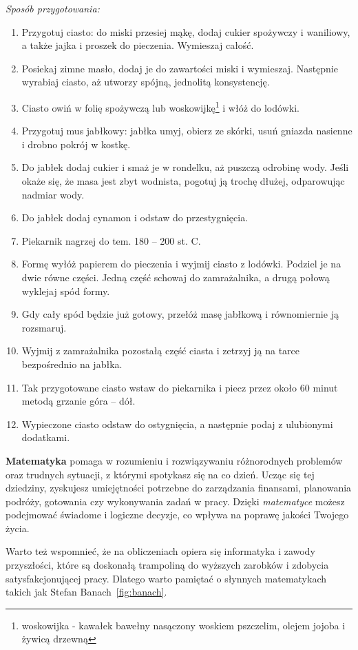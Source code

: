 \emph{Sposób przygotowania:}
\begin{enumerate}
    \item Przygotuj ciasto: do miski przesiej mąkę, dodaj cukier spożywczy i waniliowy, a także jajka i proszek do pieczenia. Wymieszaj całość.
    \item Posiekaj zimne masło, dodaj je do zawartości miski i wymieszaj. Następnie wyrabiaj ciasto, aż utworzy spójną, jednolitą konsystencję.
    \item Ciasto owiń w folię spożywczą lub woskowijkę\footnote{woskowijka - kawałek bawełny nasączony woskiem pszczelim, olejem jojoba i żywicą drzewną} i włóż do lodówki.
    \item Przygotuj mus jabłkowy: jabłka umyj, obierz ze skórki, usuń gniazda nasienne i drobno pokrój w kostkę.
    \item Do jabłek dodaj cukier i smaż je w rondelku, aż puszczą odrobinę wody. Jeśli okaże się, że masa jest zbyt wodnista, pogotuj ją trochę dłużej, odparowując nadmiar wody.
    \item Do jabłek dodaj cynamon i odstaw do przestygnięcia.
    \item Piekarnik nagrzej do tem. 180 – 200 st. C.
    \item Formę wyłóż papierem do pieczenia i wyjmij ciasto z lodówki. Podziel je na dwie równe części. Jedną część schowaj do zamrażalnika, a drugą połową wyklejaj spód formy.
    \item Gdy cały spód będzie już gotowy, przełóż masę jabłkową i równomiernie ją rozsmaruj.
    \item Wyjmij z zamrażalnika pozostałą część ciasta i zetrzyj ją na tarce bezpośrednio na jabłka.
    \item Tak przygotowane ciasto wstaw do piekarnika i piecz przez około 60 minut metodą grzanie góra – dół.
    \item Wypieczone ciasto odstaw do ostygnięcia, a następnie podaj z ulubionymi dodatkami.
\end{enumerate}
\vspace{1cm}
\textbf{Matematyka} pomaga w rozumieniu i rozwiązywaniu różnorodnych problemów oraz trudnych sytuacji, z którymi spotykasz się na co dzień. Ucząc się tej dziedziny, zyskujesz umiejętności potrzebne do zarządzania finansami, planowania podróży, gotowania czy wykonywania zadań w pracy. Dzięki \textit{matematyce} możesz podejmować świadome i logiczne decyzje, co wpływa na poprawę jakości Twojego życia.\par
Warto też wspomnieć, że na obliczeniach opiera się informatyka i zawody przyszłości, które są doskonałą trampoliną do wyższych zarobków i zdobycia satysfakcjonującej pracy. Dlatego warto pamiętać o słynnych matematykach takich jak Stefan Banach~\ref{fig:banach}.

